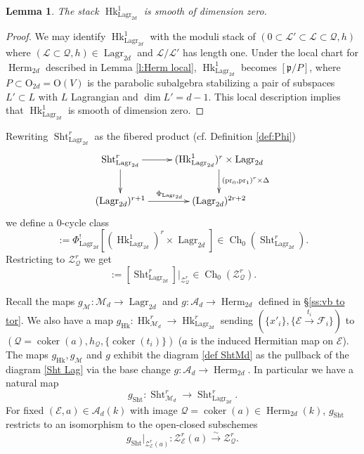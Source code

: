 \documentclass[reqno]{amsart}
\numberwithin{equation}{section}
\DeclareMathOperator{\coker}{coker}
\DeclareMathOperator{\Sht}{Sht}
\DeclareMathOperator{\pr}{pr}
\DeclareMathOperator{\Hk}{Hk}
\DeclareMathOperator{\Ch}{Ch}
\DeclareMathOperator{\Herm}{Herm}
\DeclareMathOperator{\Lagr}{Lagr}
\newcommand{\isom}{\stackrel{\sim}{\to}}
\newcommand\xr{\xrightarrow}
\newcommand\Og{\mathrm{O}}
\newcommand\cA{\mathcal{A}}
\newcommand\cE{\mathcal{E}}
\newcommand\cF{\mathcal{F}}
\newcommand\cL{\mathcal{L}}
\newcommand\cM{\mathcal{M}}
\newcommand\cQ{\mathcal{Q}}
\newcommand\cZ{\mathcal{Z}}
\newcommand\frp{\mathfrak{p}}
\newtheorem{lemma}[thm]{Lemma}
\theoremstyle{remark}
\numberwithin{equation}{section}
\begin{document}
\begin{lemma}
The stack $\Hk^{1}_{\Lagr_{2d}}$ is smooth of dimension zero.
\end{lemma}
\begin{proof}
We may identify $\Hk^{1}_{\Lagr_{2d}}$ with the moduli stack of $(0\subset \cL'\subset \cL\subset \cQ, h)$ where $(\cL\subset\cQ,h)\in\Lagr_{2d}$ and $\cL/\cL'$ has length one. Under the local chart for $\Herm_{2d}$ described in Lemma \ref{l:Herm local}, $\Hk^{1}_{\Lagr_{2d}}$ becomes $[\frp/P]$, where $P\subset \Og_{2d}=\Og(V)$ is the parabolic subalgebra stabilizing a pair of subspaces  $L'\subset L$ with $L$ Lagrangian and $\dim L'=d-1$. This local description implies that $\Hk^{1}_{\Lagr_{2d}}$ is smooth of dimension zero.
\end{proof}

Rewriting $\Sht^{r}_{\Lagr_{2d}}$ as the fibered product (cf. Definition \ref{def:Phi})
\begin{equation}\label{Sht Lagr}
\xymatrix{\Sht^{r}_{\Lagr_{2d}}\ar[r]\ar[d] & (\Hk^{1}_{\Lagr_{2d}})^{r} \times \Lagr_{2d} \ar[d]^{(\pr_{0},\pr_{1})^{r} \times \Delta}\\
(\Lagr_{2d})^{r+1}\ar[r]^{\Phi_{\Lagr_{2d}}} & (\Lagr_{2d})^{2r+2}}
\end{equation}
we define a $0$-cycle class
\begin{equation}
[\Sht^{r}_{\Lagr_{2d}}]:=\Phi_{\Lagr_{2d}}^{!}[(\Hk^{1}_{\Lagr_{2d}})^{r} \times \Lagr_{2d}]\in \Ch_{0}(\Sht^{r}_{\Lagr_{2d}}).
\end{equation}
Restricting to $\cZ^{r}_{\cQ}$ we get
\begin{equation}
[\cZ^{r}_{\cQ}]:=[\Sht^{r}_{\Lagr_{2d}}]|_{\cZ^{r}_{\cQ}}\in \Ch_{0}(\cZ^{r}_{\cQ}).
\end{equation}

Recall the maps $g_{\cM}: \cM_{d}\to \Lagr_{2d}$ and $g:\cA_{d}\to \Herm_{2d}$ defined in \S\ref{ss:vb to tor}. We also have a map  $g_{\Hk}: \Hk^{r}_{\cM_{d}}\to \Hk^{r}_{\Lagr_{2d}}$ sending $(\{x'_{i}\} , \{\cE\xr{t_{i}}\cF_{i}\})$ to $(\cQ=\coker(a), h_{\cQ}, \{\coker(t_{i})\})$ ($a$ is the induced Hermitian map on $\cE$).   The maps $g_{\Hk}, g_{\cM}$ and $g$ exhibit the diagram \eqref{def ShtMd} as the pullback of the diagram \eqref{Sht Lag} via the base change $g: \cA_{d}\to\Herm_{2d}$.  In particular we have a natural map
\begin{equation}
g_{\Sht}: \Sht^{r}_{\cM_{d}}\to \Sht^{r}_{\Lagr_{2d}}.
\end{equation}
For fixed $(\cE,a)\in \cA_{d}(k)$ with image $\cQ=\coker(a)\in \Herm_{2d}(k)$, $g_{\Sht}$ restricts to an isomorphism to the open-closed subschemes
\begin{equation}\label{gSht}
g_{\Sht}|_{\cZ^{r}_{\cE}(a)}: \cZ^{r}_{\cE}(a)\isom \cZ^{r}_{\cQ}.
\end{equation}
\end{document}
